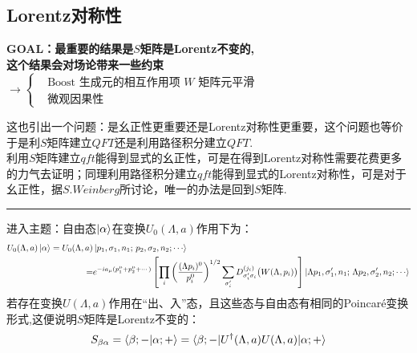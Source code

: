 \subsection{Lorentz对称性}\label{S_lorentz}
\begin{center}
    \color{blue}\textbf{GOAL：最重要的结果是$S$矩阵是Lorentz不变的,\\这个结果会对场论带来一些约束
    $\to\left\{\begin{aligned}
    &\text{Boost 生成元的相互作用项 } W \text{ 矩阵元平滑} \\
    &\text{微观因果性}
\end{aligned}\right.$} 
\end{center}
 \color{blue}这也引出一个问题：是幺正性更重要还是Lorentz对称性更重要，这个问题也等价于是利$S$矩阵建立$QFT$还是利用路径积分建立$QFT$.\\利用$S$矩阵建立$qft$能得到显式的幺正性，可是在得到Lorentz对称性需要花费更多的力气去证明；同理利用路径积分建立$qft$能得到显式的Lorentz对称性，可是对于幺正性，据$S.Weinberg$所讨论，唯一的办法是回到$S$矩阵.
\normalcolor\vspace{2ex}
\vspace{2ex}
\hrule\vspace{2ex}
进入主题：自由态$\ket{\alpha}$在变换$U_0(\Lambda,a)$作用下为：
\[\begin{aligned}
             U_0(\Lambda,a)\Ket{\alpha}=
            U_0(\Lambda,a)&\ket{p_1,\sigma_1,n_1;\,p_2,\sigma_2,n_2;\cdots}
            \\=&
            e^{-i a_\mu (p_1^\mu+p_2^\mu+\cdots)} 
            \left[
            \prod_i
            \left(
            \frac{(\Lambda p_i)^0}{p_i^0}
            \right)^{1/2}
            \sum_{\sigma_i'}
            D^{(j_i)}_{\sigma_i'\sigma_i}
            \bigl(W(\Lambda,p_i)\bigr)
            \right]
            \ket{\Lambda p_1,\sigma_1',n_1;\,\Lambda p_2,\sigma_2',n_2;\cdots}
 \end{aligned}\]
若存在变换$U(\Lambda,a)$作用在“出、入”态，且这些态与自由态有相同的Poincar\'e变换形式,这便说明$S$矩阵是Lorentz不变的：\begin{equation}
    S_{\beta\alpha}=\braket{\beta;-|\alpha;+}=\braket{\beta;-|U^\dagger(\Lambda,a)U(\Lambda,a)|\alpha;+}
\end{equation}

